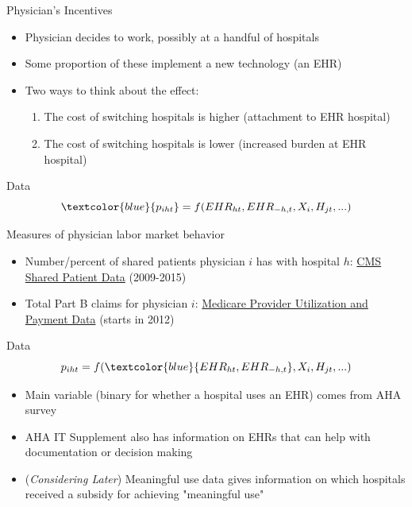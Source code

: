 \documentclass[10pt]{beamer}
\begin{document}
\begin{frame}{Physician's Incentives}
\begin{itemize}
    \item Physician decides to work, possibly at a handful of hospitals
    \item Some proportion of these implement a new technology (an EHR)
    \item Two ways to think about the effect:
    \begin{enumerate}
        \item The cost of switching hospitals is higher (attachment to EHR hospital)
        \item The cost of switching hospitals is lower (increased burden at EHR hospital)
    \end{enumerate}
\end{itemize}
\end{frame}


\begin{frame}{Data}
\begin{equation*}
    \textcolor{blue}{p_{iht}}=f(EHR_{ht},EHR_{-h,t},X_i,H_{jt},...)
\end{equation*}

\vspace{3mm}

Measures of physician labor market behavior
\begin{itemize}
    \item Number/percent of shared patients physician $i$ has with hospital $h$: \underline{CMS Shared Patient Data} (2009-2015)
    \item Total Part B claims for physician $i$: \underline{Medicare Provider Utilization and Payment Data} (starts in 2012)
\end{itemize}
\end{frame}

\begin{frame}[noframenumbering]{Data}
\begin{equation*}
    p_{iht}=f(\textcolor{blue}{EHR_{ht},EHR_{-h,t}},X_i,H_{jt},...)
\end{equation*}

\vspace{5mm}

\begin{itemize}
    \item Main variable (binary for whether a hospital uses an EHR) comes from AHA survey
    \item AHA IT Supplement also has information on EHRs that can help with documentation or decision making
    \item (\textit{Considering Later}) Meaningful use data gives information on which hospitals received a subsidy for achieving "meaningful use"
\end{itemize}
\end{frame}
\end{document}

